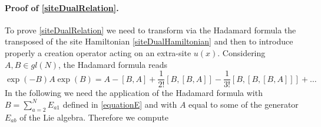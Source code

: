 \documentclass[10pt]{article}
\numberwithin{equation}{section}
\numberwithin{equation}{subsection}
\begin{document}
 \paragraph{Proof of \eqref{siteDualRelation}.} To prove \eqref{siteDualRelation} we need to transform via the Hadamard formula the transposed of the site Hamiltonian \eqref{siteDualHamiltonian} and then to  introduce properly a creation operator acting on an extra-site $u(x)$. %
 Considering $A,B\in gl(N)$, the Hadamard formula reads 
 \begin{equation}\label{HadamardFormula}
     \exp{(-B)}A\exp{(B)}=A-\left[B,A\right]+\frac{1}{2!}\left[B,\left[B,A\right]\right]-\frac{1}{3!}\left[B,\left[B,\left[B,A\right]\right]\right]+\ldots
 \end{equation}
In the following we need the application of the Hadamard formula with $B=\sum_{a=2}^{N}E_{a1}$ defined in \eqref{equationE} and with $A$ equal to some of the generator $E_{ab}$ of the Lie algebra. Therefore we compute 
\end{document}
